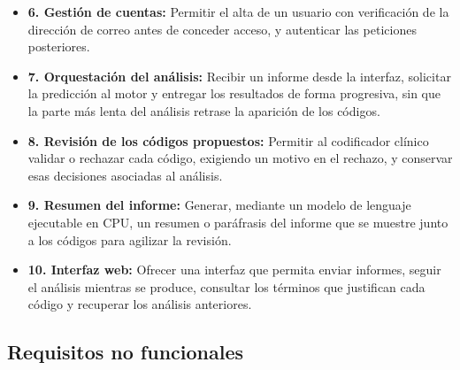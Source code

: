 \begin{itemize}
 \item \textbf{6. Gestión de cuentas:} Permitir el alta de un usuario con verificación de la dirección de correo antes de conceder acceso, y autenticar las peticiones posteriores.
 \item \textbf{7. Orquestación del análisis:} Recibir un informe desde la interfaz, solicitar la predicción al motor y entregar los resultados de forma progresiva, sin que la parte más lenta del análisis retrase la aparición de los códigos.
 \item \textbf{8. Revisión de los códigos propuestos:} Permitir al codificador clínico validar o rechazar cada código, exigiendo un motivo en el rechazo, y conservar esas decisiones asociadas al análisis.
 \item \textbf{9. Resumen del informe:} Generar, mediante un modelo de lenguaje ejecutable en CPU, un resumen o paráfrasis del informe que se muestre junto a los códigos para agilizar la revisión.
 \item \textbf{10. Interfaz web:} Ofrecer una interfaz que permita enviar informes, seguir el análisis mientras se produce, consultar los términos que justifican cada código y recuperar los análisis anteriores.
\end{itemize}

\subsection{Requisitos no funcionales}

